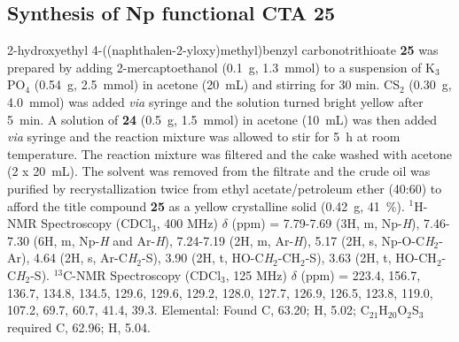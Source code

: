\documentclass[a4wide,12pt]{report} %
\begin{document}
\subsection{Synthesis of Np functional CTA {\bf 25}}
%
2-hydroxyethyl 4-((naphthalen-2-yloxy)methyl)benzyl carbonotrithioate  {\bf 25} was prepared by adding 2-mercaptoethanol (0.1~g, 1.3~mmol) to a suspension of K$_3$PO$_4$ (0.54~g, 2.5~mmol) in acetone (20~mL) and stirring for 30 min. 
%
CS$_2$ (0.30~g, 4.0~mmol) was added {\it via} syringe and the solution turned bright yellow after 5~min.
%
A solution of {\bf 24} (0.5~g, 1.5~mmol) in acetone (10~mL) was then added {\it via} syringe and the reaction mixture was allowed to stir for 5~h at room temperature. 
%
The reaction mixture was filtered and the cake washed with acetone (2 x 20~mL). 
%
The solvent was removed from the filtrate and the crude oil was purified by recrystallization twice from ethyl acetate/petroleum ether (40:60) to afford the title compound {\bf 25} as a yellow crystalline solid (0.42~g, 41~\%). 
%
$^1$H-NMR Spectroscopy (CDCl$_3$, 400 MHz) $\delta$ (ppm) = 7.79-7.69 (3H, m, Np-{\it H}), 7.46-7.30 (6H, m, Np-{\it H} and Ar-{\it H}), 7.24-7.19 (2H, m, Ar-{\it H}), 5.17 (2H, s, Np-O-C{\it H}$_2$-Ar), 4.64 (2H, s, Ar-C{\it H}$_2$-S), 3.90 (2H, t, HO-C{\it H}$_2$-CH$_2$-S), 3.63 (2H, t, HO-CH$_2$-C{\it H}$_2$-S).
%
$^{13}$C-NMR Spectroscopy (CDCl$_3$, 125 MHz) $\delta$ (ppm) = 223.4, 156.7, 136.7, 134.8, 134.5, 129.6, 129.6, 129.2, 128.0, 127.7, 126.9, 126.5, 123.8, 119.0, 107.2, 69.7, 60.7, 41.4, 39.3.
%
%
Elemental: Found C, 63.20; H, 5.02; C$_{21}$H$_{20}$O$_2$S$_3$ required C, 62.96; H, 5.04.
%











\singlespacing





\end{document}
